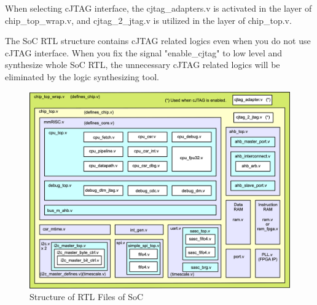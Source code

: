 When selecting cJTAG interface, the cjtag\_adapters.v is activated in the layer of chip\_top\_wrap.v, and cjtag\_2\_jtag.v is utilized in the layer of chip\_top.v. 

The SoC RTL structure contains cJTAG related logics even when you do not use cJTAG interface. When you fix the signal "enable\_cjtag" to low level and synthesize whole SoC RTL, the unnecessary cJTAG related logics will be eliminated by the logic synthesizing tool.

\begin{figure}[H]
    \includegraphics[width=1.0\columnwidth]{./Figure/CHIPRTLStructure.png}
    \caption{Structure of RTL Files of SoC}
    \label{fig:CHIPRTLSTRUCTURE}
\end{figure}

